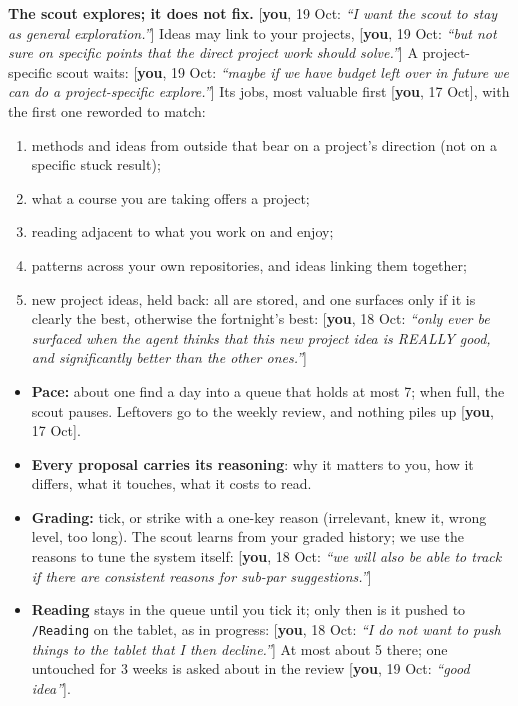 \documentclass[10pt]{extarticle}
\newcommand{\you}[2]{{\small[\textbf{you}, #1: \textit{``#2''}]}}
\newcommand{\youx}[1]{{\small[\textbf{you}, #1]}}
\begin{document}
\textbf{The scout explores; it does not fix.} \you{19 Oct}{I want the scout to stay as general exploration.} Ideas may link to your projects, \you{19 Oct}{but not sure on specific points that the direct project work should solve.} A project-specific scout waits: \you{19 Oct}{maybe if we have budget left over in future we can do a project-specific explore.} Its jobs, most valuable first \youx{17 Oct}, with the first one reworded to match:
\begin{enumerate}
\item methods and ideas from outside that bear on a project's direction (not on a specific stuck result);
\item what a course you are taking offers a project;
\item reading adjacent to what you work on and enjoy;
\item patterns across your own repositories, and ideas linking them together;
\item new project ideas, held back: all are stored, and one surfaces only if it is clearly the best, otherwise the fortnight's best: \you{18 Oct}{only ever be surfaced when the agent thinks that this new project idea is REALLY good, and significantly better than the other ones.}
\end{enumerate}

\begin{itemize}
\item \textbf{Pace:} about one find a day into a queue that holds at most 7; when full, the scout pauses. Leftovers go to the weekly review, and nothing piles up \youx{17 Oct}.
\item \textbf{Every proposal carries its reasoning}: why it matters to you, how it differs, what it touches, what it costs to read.
\item \textbf{Grading:} tick, or strike with a one-key reason (irrelevant, knew it, wrong level, too long). The scout learns from your graded history; we use the reasons to tune the system itself: \you{18 Oct}{we will also be able to track if there are consistent reasons for sub-par suggestions.}
\item \textbf{Reading} stays in the queue until you tick it; only then is it pushed to \texttt{/Reading} on the tablet, as in progress: \you{18 Oct}{I do not want to push things to the tablet that I then decline.} At most about 5 there; one untouched for 3 weeks is asked about in the review \you{19 Oct}{good idea}.
\end{itemize}
\end{document}
